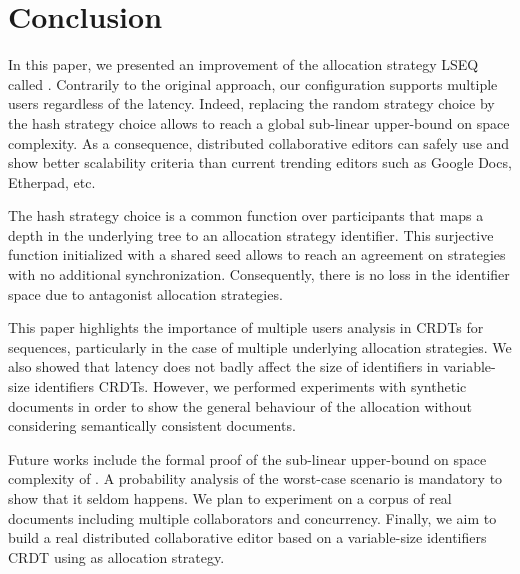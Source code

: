 
\section{Conclusion}

In this paper, we presented an improvement of the allocation strategy LSEQ
called \NAME{}. Contrarily to the original approach, our configuration supports
multiple users regardless of the latency. Indeed, replacing the random strategy
choice by the hash strategy choice allows to reach a global sub-linear
upper-bound on space complexity. As a consequence, distributed collaborative
editors can safely use \NAME{} and show better scalability criteria than
current trending editors such as Google Docs, Etherpad, etc.

The hash strategy choice is a common function over participants that maps a
depth in the underlying tree to an allocation strategy identifier. This
surjective function initialized with a shared seed allows to reach an agreement
on strategies with no additional synchronization. Consequently, there is no
loss in the identifier space due to antagonist allocation strategies.

This paper highlights the importance of multiple users analysis in CRDTs for
sequences, particularly in the case of multiple underlying allocation
strategies. We also showed that latency does not badly affect the size of
identifiers in variable-size identifiers CRDTs. However, we performed
experiments with synthetic documents in order to show the general behaviour of
the allocation without considering semantically consistent documents.

Future works include the formal proof of the sub-linear upper-bound on space
complexity of \NAME{}. A probability analysis of the worst-case scenario is
mandatory to show that it seldom happens. We plan to experiment \NAME{} on a
corpus of real documents including multiple collaborators and
concurrency. Finally, we aim to build a real distributed collaborative editor
based on a variable-size identifiers CRDT using \NAME{} as allocation strategy.

